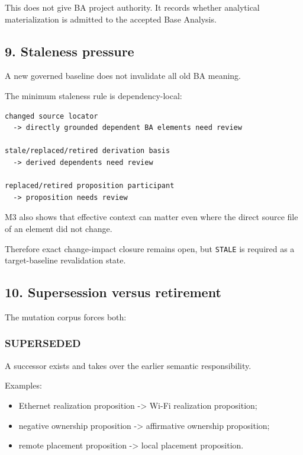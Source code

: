 \documentclass[11pt,a4paper]{article}
\providecommand{\tightlist}{\setlength{\itemsep}{0pt}\setlength{\parskip}{0pt}}\setlength{\emergencystretch}{4em}\hbadness=10000\hfuzz=20pt\sloppy
\begin{document}
This does not give BA project authority. It records whether analytical
materialization is admitted to the accepted Base Analysis.

\subsection{9. Staleness pressure}\label{staleness-pressure}

A new governed baseline does not invalidate all old BA meaning.

The minimum staleness rule is dependency-local:

\begin{verbatim}
changed source locator
  -> directly grounded dependent BA elements need review

stale/replaced/retired derivation basis
  -> derived dependents need review

replaced/retired proposition participant
  -> proposition needs review
\end{verbatim}

M3 also shows that effective context can matter even where the direct
source file of an element did not change.

Therefore exact change-impact closure remains open, but \texttt{STALE}
is required as a target-baseline revalidation state.

\subsection{10. Supersession versus
retirement}\label{supersession-versus-retirement}

The mutation corpus forces both:

\subsubsection{SUPERSEDED}\label{superseded}

A successor exists and takes over the earlier semantic responsibility.

Examples:

\begin{itemize}
\tightlist
\item
  Ethernet realization proposition -\textgreater{} Wi-Fi realization
  proposition;
\item
  negative ownership proposition -\textgreater{} affirmative ownership
  proposition;
\item
  remote placement proposition -\textgreater{} local placement
  proposition.
\end{itemize}
\end{document}
